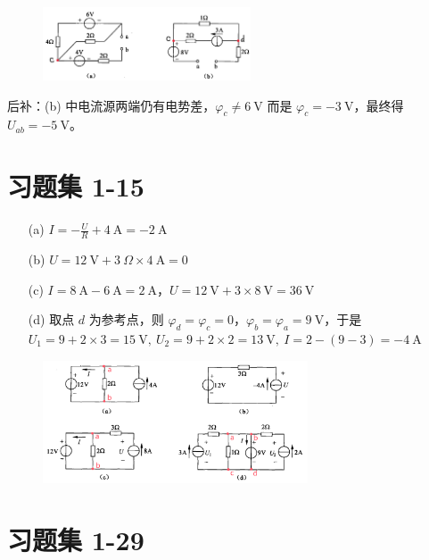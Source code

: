 \documentclass[UTF8]{report}
\theoremstyle{MyLineTheoremStyle} %
\theoremstyle{MyBlockTheoremStyle} %
\theoremstyle{MySubsubsectionStyle} %
\begin{document}
\begin{figure}[H]\centering
\includegraphics[width=0.55\textwidth]{assets/1/9dda9e5f333b8cb7f498d15c015e5fd0.png}
\end{figure}
{\par\color{gray}\small
后补：(b) 中电流源两端仍有电势差，$\varphi_c \ne 6 \ \mathrm{V}$ 而是 $ \varphi_c = -3\ \mathrm{V} $，最终得 $U_{ab} = -5 \ \mathrm{V}$。
\par}


\section{习题集 1-15}

\begin{enumerate}
    \item[(a)] $I = -\frac{U}{R} + 4\ \mathrm{A} = -2 \ \mathrm{A}$
    \item[(b)] $U =12 \ \mathrm{V} + 3\ \Omega \times 4 \ \mathrm{A} = 0 $ 
    \item[(c)] $I = 8 \ \mathrm{A} - 6\ \mathrm{A} = 2 \ \mathrm{A}$，$ U = 12 \ \mathrm{V} + 3\times8 \ \mathrm{V} = 36 \ \mathrm{V}$ 
    \item[(d)] 取点 $ d $ 为参考点，则 $\varphi_d = \varphi_c = 0$，$\varphi_b = \varphi_a = 9 \ \mathrm{V}$，于是 $U_1 = 9 + 2\times3 = 15\ \mathrm{V},\ U_2 = 9 + 2\times 2 = 13 \ \mathrm{V},\ I =2 -  (9-3) = - 4 \ \mathrm{A}$
\end{enumerate}

\begin{figure}[H]\centering
\includegraphics[width=0.7\textwidth]{assets/1/b82ef4f3b4efd9d0ee903e5f19353345.png}
\end{figure}

\section{习题集 1-29}
\end{document}
